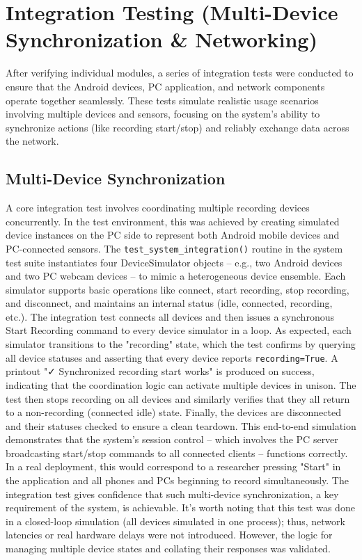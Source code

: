 \section{Integration Testing (Multi-Device Synchronization \& Networking)}

After verifying individual modules, a series of integration tests were conducted to ensure that the Android devices, PC application, and network components operate together seamlessly. These tests simulate realistic usage scenarios involving multiple devices and sensors, focusing on the system's ability to synchronize actions (like recording start/stop) and reliably exchange data across the network.

\subsection{Multi-Device Synchronization}

A core integration test involves coordinating multiple recording devices concurrently. In the test environment, this was achieved by creating simulated device instances on the PC side to represent both Android mobile devices and PC-connected sensors. The \texttt{test\_system\_integration()} routine in the system test suite instantiates four DeviceSimulator objects – e.g., two Android devices and two PC webcam devices – to mimic a heterogeneous device ensemble. Each simulator supports basic operations like connect, start recording, stop recording, and disconnect, and maintains an internal status (idle, connected, recording, etc.). The integration test connects all devices and then issues a synchronous Start Recording command to every device simulator in a loop. As expected, each simulator transitions to the "recording" state, which the test confirms by querying all device statuses and asserting that every device reports \texttt{recording=True}. A printout "✓ Synchronized recording start works" is produced on success, indicating that the coordination logic can activate multiple devices in unison. The test then stops recording on all devices and similarly verifies that they all return to a non-recording (connected idle) state. Finally, the devices are disconnected and their statuses checked to ensure a clean teardown. This end-to-end simulation demonstrates that the system's session control – which involves the PC server broadcasting start/stop commands to all connected clients – functions correctly. In a real deployment, this would correspond to a researcher pressing "Start" in the application and all phones and PCs beginning to record simultaneously. The integration test gives confidence that such multi-device synchronization, a key requirement of the system, is achievable. It's worth noting that this test was done in a closed-loop simulation (all devices simulated in one process); thus, network latencies or real hardware delays were not introduced. However, the logic for managing multiple device states and collating their responses was validated.

